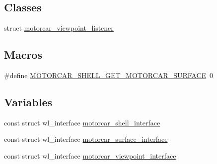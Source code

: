 \subsection*{Classes}
\begin{DoxyCompactItemize}
\item 
struct \hyperlink{structmotorcar__viewpoint__listener}{motorcar\-\_\-viewpoint\-\_\-listener}
\end{DoxyCompactItemize}
\subsection*{Macros}
\begin{DoxyCompactItemize}
\item 
\#define \hyperlink{clients_2simple-egl_2motorcar-client-protocol_8h_a99bdc7c0bb1a6088577cfe9c263b33a4}{M\-O\-T\-O\-R\-C\-A\-R\-\_\-\-S\-H\-E\-L\-L\-\_\-\-G\-E\-T\-\_\-\-M\-O\-T\-O\-R\-C\-A\-R\-\_\-\-S\-U\-R\-F\-A\-C\-E}~0
\end{DoxyCompactItemize}
\subsection*{Variables}
\begin{DoxyCompactItemize}
\item 
const struct wl\-\_\-interface \hyperlink{clients_2simple-egl_2motorcar-client-protocol_8h_a4decf5a74ff7a553e7cb41be3a9c580e}{motorcar\-\_\-shell\-\_\-interface}
\item 
const struct wl\-\_\-interface \hyperlink{clients_2simple-egl_2motorcar-client-protocol_8h_a56acb8594d0103b3705453e8ea77915b}{motorcar\-\_\-surface\-\_\-interface}
\item 
const struct wl\-\_\-interface \hyperlink{clients_2simple-egl_2motorcar-client-protocol_8h_a90843869d07a9812f0b0eb66ed03ed20}{motorcar\-\_\-viewpoint\-\_\-interface}
\end{DoxyCompactItemize}


